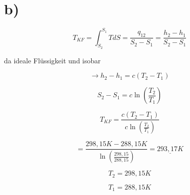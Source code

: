 

\section*{b)}

\[
T_{KF} = \int_{S_2}^{S_1} T dS = \frac{q_{12}}{S_2 - S_1} = \frac{h_2 - h_1}{S_2 - S_1}
\]

da ideale Flüssigkeit und isobar

\[
\rightarrow h_2 - h_1 = c (T_2 - T_1)
\]

\[
S_2 - S_1 = c \ln \left( \frac{T_2}{T_1} \right)
\]

\[
T_{KF} = \frac{c (T_2 - T_1)}{c \ln \left( \frac{T_2}{T_1} \right)}
\]

\[
= \frac{298,15 K - 288,15 K}{\ln \left( \frac{298,15}{288,15} \right)} = \underline{293,17 K}
\]

\[
T_2 = 298,15 K
\]

\[
T_1 = 288,15 K
\]